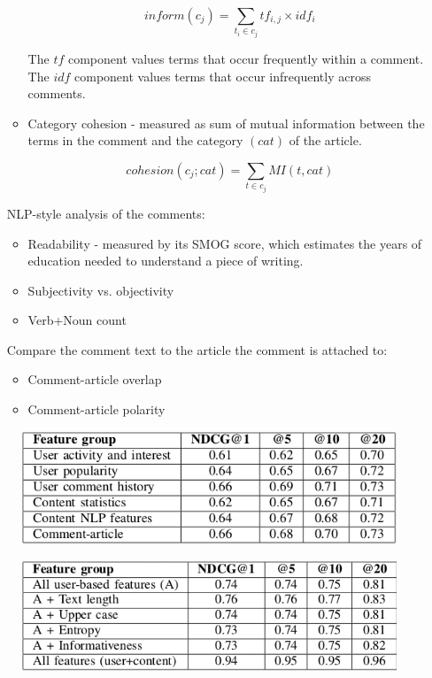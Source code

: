 \documentclass{article}
\begin{document}
\begin{itemize}
\begin{itemize}
\[
inform(c_j) = \sum_{t_i \in c_j} tf_{i,j} \times idf_i
\]

The $tf$ component values terms that occur frequently within a comment. The $idf$ component values terms that occur infrequently across comments.

\item Category cohesion - measured as sum of mutual information between the terms in the comment and the category $(cat)$ of the article.

\[
cohesion(c_j;cat) = \sum_{t \in c_j} MI(t,cat)
\]
\end{itemize}

NLP-style analysis of the comments:
\begin{itemize}
\item Readability - measured by its SMOG score, which estimates the years of
education needed to understand a piece of writing.
\item Subjectivity vs. objectivity
\item Verb+Noun count
\end{itemize}

Compare the comment text to the article the comment is attached to:
\begin{itemize}
\item Comment-article overlap
\item Comment-article polarity
\end{itemize}

\end{itemize}

\begin{figure}[!htb]
  \centering
  \includegraphics[scale=0.60]{results2.png}
\end{figure}

\begin{figure}[!htb]
  \centering
  \includegraphics[scale=0.60]{results3.png}
\end{figure}

{}

\end{document}
